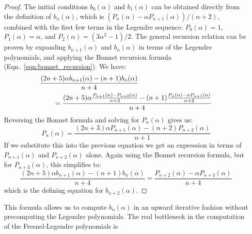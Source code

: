 \documentclass{article}
\theoremstyle{plain}
\begin{document}
        \begin{proof}
            The initial conditions $b_{0}(\alpha)$ and $b_{1}(\alpha)$
            can be obtained directly from the definition of $b_{n}(\alpha)$,
            which is
            $(P_{n}(\alpha)-\alpha{P}_{n+1}(\alpha))/(n+2)$,
            combined with the first few
            terms in the Legendre sequence: $P_{0}(\alpha)=1$,
            $P_{1}(\alpha)=\alpha$, and $P_{2}(\alpha)=(3\alpha^{2}-1)/2$.
            The general recursion relation can be
            proven by expanding $b_{n+1}(\alpha)$ and $b_{n}(\alpha)$ in
            terms of the Legendre polynomials, and applying the Bonnet
            recursion formula (Eqn.~\ref{eqn:bonnet_recursion}). We have:
            \begin{equation}
                \begin{aligned}
                    &\frac{(2n+5)
                    \alpha{b}_{n+1}(\alpha)-(n+1)b_{n}(\alpha)}{n+4}\\
                    &\quad\quad=\frac{%
                        (2n+5)\alpha\frac{P_{n+1}(\alpha)-P_{n+2}(\alpha)}{n+3}-
                        (n+1)\frac{P_{n}(\alpha)-\alpha{P}_{n+1}(\alpha)}{n+2}
                    }{n+4}
                \end{aligned}
            \end{equation}
            Reversing the Bonnet formula and solving for
            $P_{n}(\alpha)$ gives us:
            \begin{equation}
                P_{n}(\alpha)
                =\frac{(2n+3)\alpha{P}_{n+1}(\alpha)-(n+2)P_{n+2}(\alpha)}{n+1}
            \end{equation}
            If we substitute this into the previous equation we get an
            expression in terms of $P_{n+1}(\alpha)$ and $P_{n+2}(\alpha)$
            alone. Again using the Bonnet recursion formula,
            but for $P_{n+3}(\alpha)$, this simplifies to:
            \begin{equation}
                \frac{(2n+5)\alpha{b}_{n+1}(\alpha)-(n+1)b_{n}(\alpha)}{n+4}
                =\frac{P_{n+2}(\alpha)-\alpha{P}_{n+3}(\alpha)}{n+4}
            \end{equation}
            which is the defining equation for $b_{n+2}(\alpha)$.
        \end{proof}
        This formula allows us to compute $b_{n}(\alpha)$ in an upward iterative
        fashion without precomputing the Legendre polynomials. The real
        bottleneck in the computation of the Fresnel-Legendre polynomials is
\end{document}
